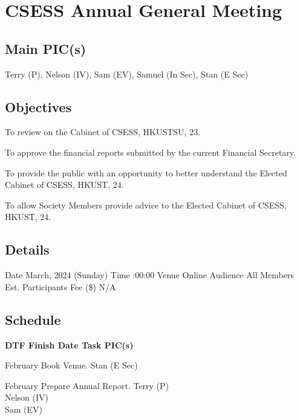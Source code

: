 \section{CSESS Annual General Meeting}

\subsection{Main PIC(s)}
Terry (P), Nelson (IV), Sam (EV), Samuel (In Sec), Stan (E Sec)

\subsection{Objectives}
\startitemize
\item To review on the Cabinet of CSESS, HKUSTSU, 23.
\item To approve the financial reports submitted by the current Financial Secretary.
\item To provide the public with an opportunity to better understand the Elected Cabinet of CSESS, HKUST, 24.
\item To allow Society Members provide advice to the Elected Cabinet of CSESS, HKUST, 24.
\stopitemize

\subsection{Details}
\starttabulate[|rB|l|]
\NC Date
 March, 2024 (Sunday) \NR
\NC Time
:00:00 \NR
\NC Venue
\NC Online \NR
\NC Audience
\NC All Members \NR
\NC Est. Participants
 \NR
\NC Fee (\$)
\NC N/A \NR
\stoptabulate

\subsection{Schedule}

\setupTABLE[c][1][width=0.75in]
\setupTABLE[c][2][width=1in]
\setupTABLE[c][3][width=3in]
\setupTABLE[c][4][width=1.25in]
\bTABLE
\bTABLEhead

\bTR\bTH    \bf{DTF}
\eTH\bTH    \bf{Finish Date}
\eTH\bTH    \bf{Task}
\eTH\bTH    \bf{PIC(s)}
\eTH\eTR

\eTABLEhead
\bTABLEbody

\bTR{}
\eTD{} February
\eTD\bTD Book Venue.
\eTD\bTD Stan (E Sec)
\eTD\eTR

\bTR{}
\eTD{} February
\eTD\bTD Prepare Annual Report.
\eTD\bTD Terry (P) \\ Nelson (IV) \\ Sam (EV)
\eTD\eTR

